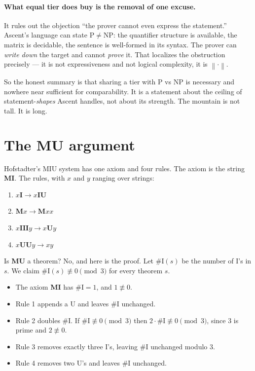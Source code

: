 \documentclass[11pt,a4paper]{article}
\newcommand{\shortest}[1]{\left\lVert #1 \right\rVert}
\begin{document}
\paragraph{What equal tier does buy is the removal of one excuse.} It rules
out the objection ``the prover cannot even express the statement.'' Ascent's
language can state $\mathrm{P} \neq \mathrm{NP}$: the quantifier structure is
available, the matrix is decidable, the sentence is well-formed in its syntax.
The prover can \emph{write down} the target and cannot \emph{prove} it. That
localizes the obstruction precisely --- it is not expressiveness and not
logical complexity, it is $\shortest{\cdot}$.

So the honest summary is that sharing a tier with P vs NP is necessary and
nowhere near sufficient for comparability. It is a statement about the ceiling
of statement-\emph{shapes} Ascent handles, not about its strength. The mountain
is not tall. It is long.

\section{The MU argument}

Hofstadter's MIU system has one axiom and four rules. The axiom is the string
\textbf{MI}. The rules, with $x$ and $y$ ranging over strings:

\begin{enumerate}
\item $x\textbf{I} \to x\textbf{IU}$
\item $\textbf{M}x \to \textbf{M}xx$
\item $x\textbf{III}y \to x\textbf{U}y$
\item $x\textbf{UU}y \to xy$
\end{enumerate}

Is \textbf{MU} a theorem? No, and here is the proof. Let $\#\mathrm{I}(s)$ be
the number of I's in $s$. We claim $\#\mathrm{I}(s) \not\equiv 0 \pmod 3$ for
every theorem $s$.

\begin{itemize}
\item The axiom \textbf{MI} has $\#\mathrm{I} = 1$, and $1 \not\equiv 0$.
\item Rule 1 appends a U and leaves $\#\mathrm{I}$ unchanged.
\item Rule 2 doubles $\#\mathrm{I}$. If $\#\mathrm{I} \not\equiv 0 \pmod 3$
then $2\cdot\#\mathrm{I} \not\equiv 0 \pmod 3$, since $3$ is prime and
$2 \not\equiv 0$.
\item Rule 3 removes exactly three I's, leaving $\#\mathrm{I}$ unchanged
modulo $3$.
\item Rule 4 removes two U's and leaves $\#\mathrm{I}$ unchanged.
\end{itemize}
\end{document}
